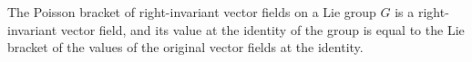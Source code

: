 The Poisson bracket of right-invariant vector fields on a Lie group $G$ is a right-invariant vector field, and its value at the identity of the group is equal to the Lie bracket of the values of the original vector fields at the identity.
